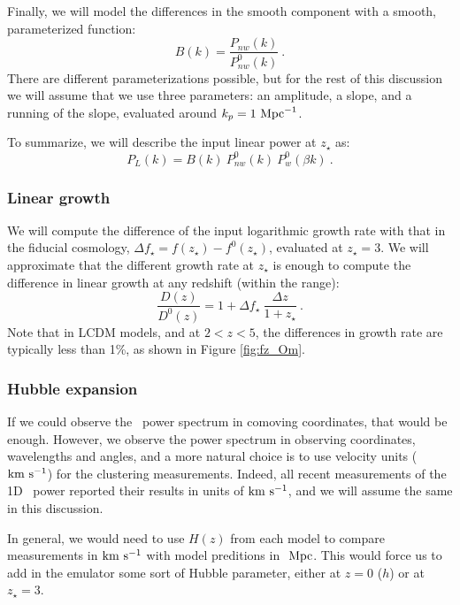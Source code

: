 Finally, we will model the differences in the smooth component with a smooth,
parameterized function:
\begin{equation}
 B(k) = \frac{P_{nw}(k)}{P_{nw}^0(k)} ~.
\end{equation}
There are different parameterizations possible, but for the rest of this 
discussion we will assume that we use three parameters: an amplitude, 
a slope, and a running of the slope, evaluated around $k_p = 1 \ \text{Mpc}^{-1}$. 

To summarize, we will describe the input linear power at $z_\star$ as:
\begin{equation}
 P_L(k) = B(k) ~ P_{nw}^0(k) ~ P_w^0(\beta k) ~.
\end{equation}

\subsubsection{Linear growth}

We will compute the difference of the input logarithmic growth rate 
  with that in the fiducial cosmology, 
  $\Delta f_\star = f(z_\star) - f^0(z_\star)$, 
  evaluated at $z_\star=3$. 
  We will approximate that the different growth rate at $z_\star$ is 
  enough to compute the difference in linear growth at any redshift 
  (within the range):
  \begin{equation}\label{eq:growth}
   \frac{D(z)}{D^0(z)} = 1 + \Delta f_\star ~ \frac{\Delta z}{1 + z_\star} ~.
  \end{equation} 
  Note that in LCDM models, and at $2 < z < 5$, the differences in growth 
  rate are typically less than 1\%, as shown in Figure \ref{fig:fz_Om}.

\subsubsection{Hubble expansion}

If we could observe the \lya\ power spectrum in comoving coordinates, that 
would be enough. 
However, we observe the power spectrum in observing coordinates, wavelengths
and angles, and a more natural choice is to use velocity units (${\rm km~s^{-1}}$) for 
the clustering measurements. 
Indeed, all recent measurements of the 1D \lya\ power reported their results
in units of ${\rm km~s^{-1}}$, and we will assume the same in this discussion.

In general, we would need to use $H(z)$ from each model to compare 
measurements in ${\rm km~s^{-1}}$ with model preditions in $\ \text{Mpc}$. 
This would force us to add in the emulator some sort of Hubble 
parameter, either at $z=0$ ($h$) or at $z_\star=3$. 

